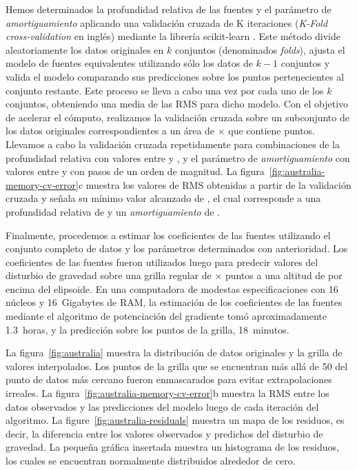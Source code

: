Hemos determinados la profundidad relativa de las fuentes y el parámetro de
\emph{amortiguamiento} aplicando una validación cruzada de K iteraciones
(\emph{K-Fold cross-validation} en inglés) mediante la librería scikit-learn
\citep{sklearn2011}.
Este método divide aleatoriamente los datos originales en $k$ conjuntos
(denominados \emph{folds}), ajusta el modelo de fuentes equivalentes utilizando
sólo los datos de $k - 1$ conjuntos y valida el modelo comparando sus
predicciones sobre los puntos pertenecientes al conjunto restante.
Este proceso se lleva a cabo una vez por cada uno de los $k$ conjuntos,
obteniendo una media de las \ac{RMS} para dicho modelo.
Con el objetivo de acelerar el cómputo, realizamos la validación cruzada sobre
un subconjunto de los datos originales correspondientes a un área de
\AustraliaSmallAreaEastingSize{}$\times$\AustraliaSmallAreaNorthingSize{}
que contiene \AustraliaSmallAreaNPoints{} puntos.
Llevamos a cabo la validación cruzada repetidamente para combinaciones de la
profundidad relativa con valores entre \AustraliaDepthMin{}
y \AustraliaDepthMax{}, y el parámetro de \emph{amortiguamiento} con valores
entre \AustraliaDampingMin{} y \AustraliaDampingMax{} con pasos de un orden de
magnitud.
La figura~\ref{fig:australia-memory-cv-error}c muestra los valores de \ac{RMS}
obtenidas a partir de la validación cruzada y señala su mínimo valor alcanzado
de \AustraliaEqlRmsScore{}, el cual corresponde a una profundidad relativa de
\AustraliaEqlDepth{} y un \emph{amortiguamiento} de \AustraliaEqlDamping{}.

Finalmente, procedemos a estimar los coeficientes de las fuentes utilizando el
conjunto completo de datos y los parámetros determinados con anterioridad.
Los coeficientes de las fuentes fueron utilizados luego para predecir valores
del disturbio de gravedad sobre una grilla regular de
\AustraliaEqlGridNLongitude{}$\times$\AustraliaEqlGridNLatitude{} puntos a una
altitud de
\AustraliaEqlGridHeight{} por encima del elipsoide.
En una computadora de modestas especificaciones con 16 núcleos y 16~Gigabytes
de RAM, la estimación de los coeficientes de las \AustraliaEqlNSources{}
fuentes mediante el algoritmo de potenciación del gradiente tomó
aproximadamente 1.3~horas, y la predicción sobre los puntos de la grilla,
18~minutos.

La figura~\ref{fig:australia}
muestra la distribución de datos originales y la grilla de valores
interpolados.
Los puntos de la grilla que se encuentran más allá de 50\km{} del punto de
datos más cercano fueron enmascarados para evitar extrapolaciones irreales.
La figura~\ref{fig:australia-memory-cv-error}b muestra la \ac{RMS} entre los
datos observados y las predicciones del modelo luego de cada iteración del
algoritmo.
La figure~\ref{fig:australia-residuals}
muestra un mapa de los residuos, es decir, la diferencia entre los valores
observados y predichos del disturbio de gravedad.
La pequeña gráfica insertada muestra un histograma de los residuos, los cuales
se encuentran normalmente distribuidos alrededor de cero.

